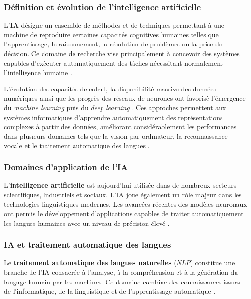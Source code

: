 \subsubsection{Définition et évolution de l'intelligence artificielle}

L'\textbf{\ac{IA}} désigne un ensemble de méthodes et de techniques permettant à une machine de reproduire certaines capacités cognitives humaines telles que l'apprentissage, le raisonnement, la résolution de problèmes ou la prise de décision. Ce domaine de recherche vise principalement à concevoir des systèmes capables d'exécuter automatiquement des tâches nécessitant normalement l'intelligence humaine \cite{Goodfellow-et-al-2016}.

L'évolution des capacités de calcul, la disponibilité massive des données numériques ainsi que les progrès des réseaux de neurones ont favorisé l'émergence du \textit{machine learning} puis du \textit{deep learning} \cite{Goodfellow-et-al-2016}. Ces approches permettent aux systèmes informatiques d'apprendre automatiquement des représentations complexes à partir des données, améliorant considérablement les performances dans plusieurs domaines tels que la vision par ordinateur, la reconnaissance vocale et le traitement automatique des langues \cite{ranathunga2023neural}.

\subsubsection{Domaines d'application de l'\ac{IA}}

L'\textbf{intelligence artificielle} est aujourd'hui utilisée dans de nombreux secteurs scientifiques, industriels et sociaux. L'\ac{IA} joue également un rôle majeur dans les technologies linguistiques modernes. Les avancées récentes des modèles neuronaux ont permis le développement d'applications capables de traiter automatiquement les langues humaines avec un niveau de précision élevé \cite{vaswani2017attention, ranathunga2023neural}.

\subsubsection{\ac{IA} et traitement automatique des langues}

Le \textbf{traitement automatique des langues naturelles} (\textit{\ac{NLP}}) constitue une branche de l'\ac{IA} consacrée à l'analyse, à la compréhension et à la génération du langage humain par les machines. Ce domaine combine des connaissances issues de l'informatique, de la linguistique et de l'apprentissage automatique \cite{ranathunga2023neural}.

